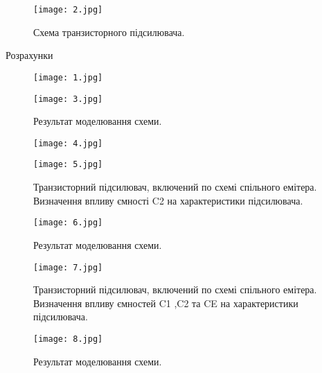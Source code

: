 \documentclass[a4paper,14pt]{extreport}
\begin{document}
\begin{figure}[h]
\begin{center}
\texttt{[image: 2.jpg]}
\caption{Схема транзисторного підсилювача.}
\label{ris4}
\end{center}
\end{figure}


\begin{center}Розрахунки\end{center}

\begin{figure}[h]
\begin{center}
\texttt{[image: 1.jpg]}
\label{ris3}
\end{center}
\end{figure}





\begin{figure}[h]
\begin{center}
\texttt{[image: 3.jpg]}
\caption{Результат моделювання схеми.}
\label{ris5}
\end{center}
\end{figure}

\begin{figure}[h]
\begin{center}
\texttt{[image: 4.jpg]}

\label{ris5}
\end{center}
\end{figure}


\begin{figure}[h]
\begin{center}
\texttt{[image: 5.jpg]}
\caption{Транзисторний підсилювач, включений по схемі спільного емітера. Визначення впливу ємності C2 на характеристики підсилювача.}
\label{ris5}
\end{center}
\end{figure}


\begin{figure}[h]
\begin{center}
\texttt{[image: 6.jpg]}
\caption{Результат моделювання схеми.}
\label{ris5}
\end{center}
\end{figure}


\begin{figure}[h]
\begin{center}
\texttt{[image: 7.jpg]}
\caption{Транзисторний підсилювач, включений по схемі спільного емітера. Визначення впливу ємностей C1 ,C2 та CE на характеристики підсилювача.}
\label{ris5}
\end{center}
\end{figure}

\begin{figure}[h]
\begin{center}
\texttt{[image: 8.jpg]}
\caption{Результат моделювання схеми.}
\label{ris5}
\end{center}
\end{figure}
\end{document}
